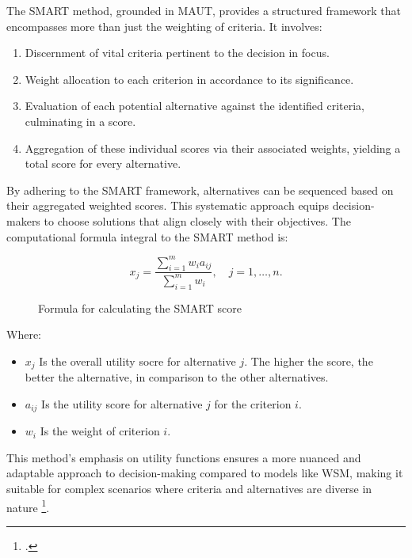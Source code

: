 The \ac{SMART} method, grounded in \ac{MAUT}, provides a
structured framework that encompasses more than just the weighting of criteria.
It involves:

\begin{enumerate} \item Discernment of vital criteria pertinent to the decision
in focus. \item Weight allocation to each criterion in accordance to its
significance. \item Evaluation of each potential alternative against the
identified criteria, culminating in a score. \item Aggregation of these
individual scores via their associated weights, yielding a total score for every
alternative. \end{enumerate}

By adhering to the \ac{SMART} framework, alternatives can be sequenced based on
their aggregated weighted scores. This systematic approach equips
decision-makers to choose solutions that align closely with their objectives.
The computational formula integral to the \ac{SMART} method is:


\begin{figure}[h]
    \centering
    \Large
    \[ x_j = \frac{\sum_{i=1}^{m} w_i a_{ij}}{\sum_{i=1}^{m} w_i}, \quad j = 1, \ldots, n. \]
    \caption{Formula for calculating the \ac*{SMART} score\protect\footnotemark} 
\end{figure}


Where:
\begin{itemize}
    \item \( x_j \) Is the overall utility socre for alternative \( j \). The higher the score, the better the alternative, in comparison to the other alternatives.
    \item \( a_{ij} \)  Is the utility score for alternative \( j \) for the criterion \( i \).
    \item \( w_i \) Is the weight of criterion \( i \).
\end{itemize}

This method's emphasis on utility functions ensures a more nuanced and adaptable
approach to decision-making compared to models like WSM, making it suitable for
complex scenarios where criteria and alternatives are diverse in nature \footcite[p. 6]{fulopIntroductionDecisionMaking2005}.

